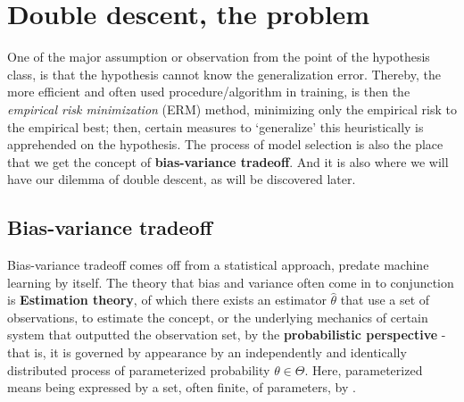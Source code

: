 \documentclass[10pt]{article}
\begin{document}
\section{Double descent, the problem}

One of the major assumption or observation from the point of the hypothesis class, is that the hypothesis cannot know the generalization error. Thereby, the more efficient and often used procedure/algorithm in training, is then the \textit{empirical risk minimization} (ERM) method, minimizing only the empirical risk to the empirical best; then, certain measures to `generalize' this heuristically is apprehended on the hypothesis. The process of model selection is also the place that we get the concept of \textbf{bias-variance tradeoff}. And it is also where we will have our dilemma of double descent, as will be discovered later. 

\subsection{Bias-variance tradeoff}

Bias-variance tradeoff comes off from a statistical approach, predate machine learning by itself. The theory that bias and variance often come in to conjunction is \textbf{Estimation theory}, of which there exists an estimator $\hat{\theta}$ that use a set of observations, to estimate the concept, or the underlying mechanics of certain system that outputted the observation set, by the \textbf{probabilistic perspective} - that is, it is governed by appearance by an independently and identically distributed process of parameterized probability $\theta\in \Theta$. Here, parameterized means being expressed by a set, often finite, of parameters, by \cite{LehmannCasella_theory_1998,liam_statistics_2005}. 
\end{document}
